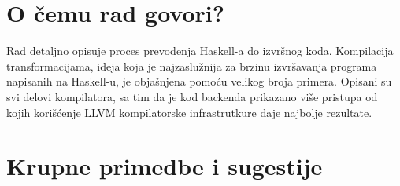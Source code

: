 \documentclass[a4paper]{report}
\begin{document}
\section{O čemu rad govori?}
Rad detaljno opisuje proces prevođenja Haskell-a do izvršnog koda. Kompilacija transformacijama, ideja koja je najzaslužnija za brzinu izvršavanja programa napisanih na Haskell-u, je objašnjena pomoću velikog broja primera. Opisani su svi delovi kompilatora, sa tim da je kod backenda prikazano više pristupa od kojih korišćenje LLVM kompilatorske infrastrutkure daje najbolje rezultate.

\section{Krupne primedbe i sugestije}
\end{document}
